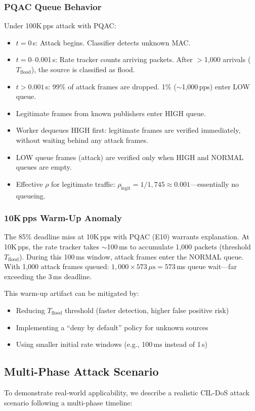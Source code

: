 \documentclass[journal]{IEEEtran}
\begin{document}
\subsubsection{PQAC Queue Behavior}
Under 100K\,pps attack with PQAC:
\begin{itemize}[leftmargin=*]
    \item $t = 0$\,s: Attack begins. Classifier detects unknown MAC.
    \item $t = 0$--0.001\,s: Rate tracker counts arriving packets. After $>$1,000 arrivals ($T_{\text{flood}}$), the source is classified as flood.
    \item $t > 0.001$\,s: 99\% of attack frames are dropped. 1\% ($\sim$1,000\,pps) enter LOW queue.
    \item Legitimate frames from known publishers enter HIGH queue.
    \item Worker dequeues HIGH first: legitimate frames are verified immediately, without waiting behind any attack frames.
    \item LOW queue frames (attack) are verified only when HIGH and NORMAL queues are empty.
    \item Effective $\rho$ for legitimate traffic: $\rho_{\text{legit}} = 1/1{,}745 \approx 0.001$---essentially no queueing.
\end{itemize}

\subsubsection{10K\,pps Warm-Up Anomaly}
The 85\% deadline miss at 10K\,pps with PQAC (E10) warrants explanation. At 10K\,pps, the rate tracker takes $\sim$100\,ms to accumulate 1,000 packets (threshold $T_{\text{flood}}$). During this 100\,ms window, attack frames enter the NORMAL queue. With 1,000 attack frames queued: $1{,}000 \times 573\,\mu\text{s} = 573$\,ms queue wait---far exceeding the 3\,ms deadline.

This warm-up artifact can be mitigated by:
\begin{itemize}[leftmargin=*]
    \item Reducing $T_{\text{flood}}$ threshold (faster detection, higher false positive risk)
    \item Implementing a ``deny by default'' policy for unknown sources
    \item Using smaller initial rate windows (e.g., 100\,ms instead of 1\,s)
\end{itemize}

\subsection{Multi-Phase Attack Scenario}
To demonstrate real-world applicability, we describe a realistic CIL-DoS attack scenario following a multi-phase timeline:
\end{document}
